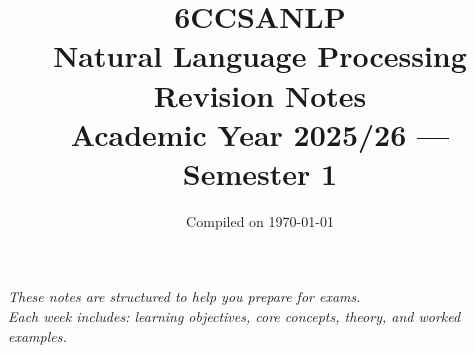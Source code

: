 \documentclass[10pt]{article}
\title{%
  \vspace{-1cm}
  {\LARGE\bfseries 6CCSANLP}\\[0.3cm]
  {\Huge Natural Language Processing}\\[0.5cm]
  {\Large Revision Notes}\\[0.3cm]
  {\large Academic Year 2025/26 --- Semester 1}
}
\author{}
\date{\vspace{-0.5cm}Compiled on \today}
\begin{document}
\maketitle
\thispagestyle{empty}

\vfill
\begin{center}
\textit{These notes are structured to help you prepare for exams.\\
Each week includes: learning objectives, core concepts, theory, and worked examples.}
\end{center}
\vfill

\clearpage
\tableofcontents

\clearpage


\clearpage


\clearpage


\clearpage


\clearpage


\clearpage



\clearpage


\clearpage


\clearpage


\clearpage


\clearpage

\end{document}
